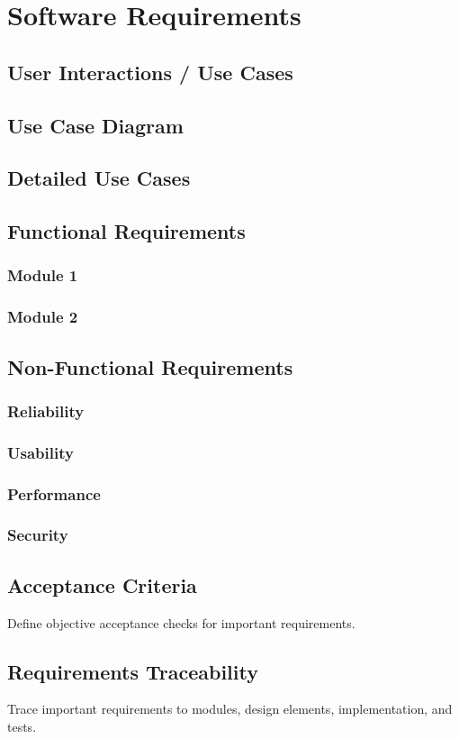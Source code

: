 \chapter{Software Requirements}
\section{User Interactions / Use Cases}
\section{Use Case Diagram}
\section{Detailed Use Cases}
\section{Functional Requirements}
\subsection{Module 1}
\subsection{Module 2}
\section{Non-Functional Requirements}
\subsection{Reliability}
\subsection{Usability}
\subsection{Performance}
\subsection{Security}
\section{Acceptance Criteria}
Define objective acceptance checks for important requirements.
\section{Requirements Traceability}
Trace important requirements to modules, design elements, implementation, and tests.
